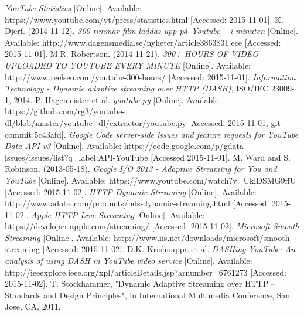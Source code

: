 \begin{thebibliography}{5}
    \footnotesize
        \textit{YouTube Statistics}
        [Online].
        Available:
        https://www.youtube.com/yt/press/statistics.html
        [Accessed: 2015-11-01].
        K. Djerf.
        (2014-11-12).
        \textit{300 timmar film laddas upp p\aa\  Youtube – i minuten}
        [Online].
        Available:
        http://www.dagensmedia.se/nyheter/article3863831.ece
        [Accessed: 2015-11-01].
        M.R. Robertson.
        (2014-11-21).
        \textit{300+ HOURS OF VIDEO UPLOADED TO YOUTUBE EVERY MINUTE}
        [Online].
        Available:
        http://www.reelseo.com/youtube-300-hours/
        [Accessed: 2015-11-01].
        \textit{Information Technology - Dynamic adaptive streaming over HTTP (DASH)},
        ISO/IEC 23009-1, 2014.
        P. Hagemeister et al.
        \textit{youtube.py}
        [Online].
        Available:
        https://github.com/rg3/youtube-dl/blob/master/youtube\_dl/extractor/youtube.py
        [Accessed: 2015-11-01, git commit 5c43afd].
        \textit{Google Code server-side issues and feature requests for YouTube Data API v3}
        [Online].
        Available:
        https://code.google.com/p/gdata-issues/issues/list?q=label:API-YouTube
        [Accessed 2015-11-01].
        M. Ward and S. Robinson.
        (2013-05-18).
        \textit{Google I/O 2013 - Adaptive Streaming for You and YouTube}
        [Online].
        Available:
        https://www.youtube.com/watch?v=UklDSMG9ffU
        [Accessed: 2015-11-02].
        \textit{HTTP Dynamic Streaming}
        [Online].
        Available:
        http://www.adobe.com/products/hds-dynamic-streaming.html
        [Accessed: 2015-11-02].
        \textit{Apple HTTP Live Streaming}
        [Online].
        Available:
        https://developer.apple.com/streaming/
        [Accessed: 2015-11-02].
        \textit{Microsoft Smooth Streaming}
        [Online].
        Available:
        http://www.iis.net/downloads/microsoft/smooth-streaming
        [Accessed: 2015-11-02].
        D.K. Krishnappa et al.
        \textit{DASHing YouTube: An analysis of using DASH in YouTube video service}
        [Online].
        Available:
        http://ieeexplore.ieee.org/xpl/articleDetails.jsp?arnumber=6761273
        [Accessed: 2015-11-02].
        T. Stockhammer,
        "Dynamic Adaptive Streaming over HTTP – Standards and Design Principles",
        in International Multimedia Conference,
        San Jose, CA,
        2011.
\end{thebibliography}
